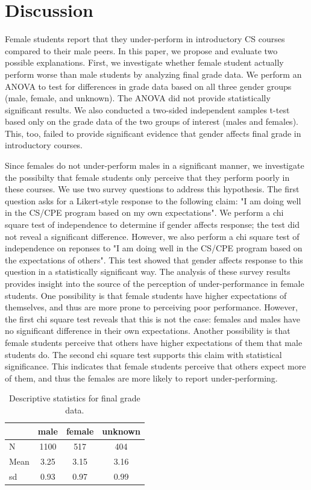 \documentclass[a4paper,man,natbib]{apa6}
\begin{document}
\section{Discussion}
Female students report that they under-perform in introductory CS courses
compared to their male peers. In this paper, we propose and evaluate two
possible explanations. First, we investigate whether female student actually
perform worse than male students by analyzing final grade data. We perform an
ANOVA to test for differences in grade data based on all three gender groups
(male, female, and unknown). The ANOVA did not provide statistically
significant results. We also conducted a two-sided independent samples t-test
based only on the grade data of the two groups of interest (males and females).
This, too, failed to provide significant evidence that gender affects final
grade in introductory courses. 

Since females do not under-perform males in a significant manner, we
investigate the possibilty that female students only perceive that they perform
poorly in these courses. We use two survey questions to address this
hypothesis. The first question asks for a Likert-style response to the
following claim: "I am doing well in the CS/CPE program based on my own
expectations". We perform a chi square test of independence to determine if
gender affects response; the test did not reveal a significant difference.
However, we also perform a chi square test of independence on reponses to "I am
doing well in the CS/CPE program based on the expectations of others". This
test showed that gender affects response to this question in a statistically
significant way. The analysis of these survey results provides insight into the
source of the perception of under-performance in female students. One
possibility is that female students have higher expectations of themselves, and
thus are more prone to perceiving poor performance. However, the first chi
square test reveals that this is not the case: females and males have no
significant difference in their own expectations. Another possibility is that
female students perceive that others have higher expectations of them that male
students do. The second chi square test supports this claim with statistical
significance. This indicates that female students perceive that others expect more of
them, and thus the females are more likely to report under-performing.

\begin{table}
\begin{tabular}{l|c|c|c}
		& male	& female	& unknown \\\hline
N		& 1100	& 517		& 404 \\
Mean	& 3.25	& 3.15		& 3.16 \\
sd		& 0.93	& 0.97		& 0.99
\end{tabular}
\caption{\label{tab:descriptive}Descriptive statistics for final grade data.}
\end{table}
\end{document}
